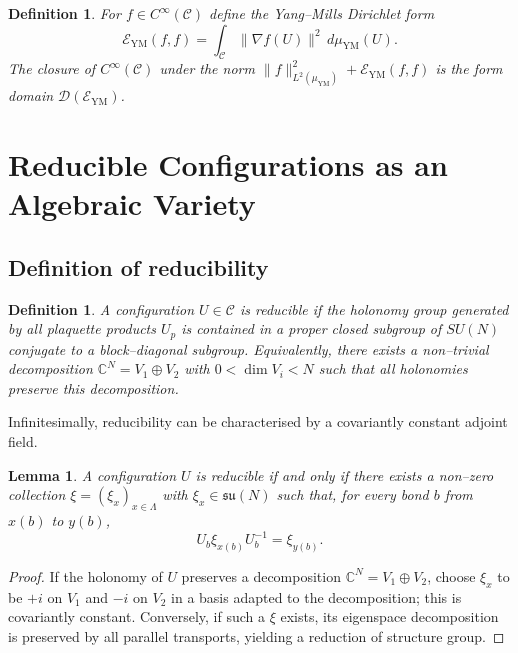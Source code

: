 \documentclass[11pt]{article}
\newtheorem{lemma}[theorem]{Lemma}
\newtheorem{definition}[theorem]{Definition}
\begin{document}
\begin{definition}
For $f\in C^\infty(\mathcal{C})$ define the Yang--Mills Dirichlet form
\begin{equation}
  \mathcal{E}_{\mathrm{YM}}(f,f)
  = \int_{\mathcal{C}} \|\nabla f(U)\|^2\,d\mu_{\mathrm{YM}}(U).
\end{equation}
The closure of $C^\infty(\mathcal{C})$ under the norm
$\|f\|_{L^2(\mu_{\mathrm{YM}})}^2 + \mathcal{E}_{\mathrm{YM}}(f,f)$ is
the form domain $\mathcal{D}(\mathcal{E}_{\mathrm{YM}})$.
\end{definition}

\section{Reducible Configurations as an Algebraic Variety}

\subsection{Definition of reducibility}

\begin{definition}
A configuration $U\in\mathcal{C}$ is \emph{reducible} if the holonomy
group generated by all plaquette products $U_p$ is contained in a
proper closed subgroup of $SU(N)$ conjugate to a block--diagonal
subgroup. Equivalently, there exists a non--trivial decomposition
$\mathbb{C}^N = V_1\oplus V_2$ with $0<\dim V_i<N$ such that all
holonomies preserve this decomposition.
\end{definition}

Infinitesimally, reducibility can be characterised by a covariantly
constant adjoint field.

\begin{lemma}
A configuration $U$ is reducible if and only if there exists a non--zero
collection $\xi = (\xi_x)_{x\in\Lambda}$ with $\xi_x\in\mathfrak{su}(N)$
such that, for every bond $b$ from $x(b)$ to $y(b)$,
\begin{equation}
  U_b\xi_{x(b)}U_b^{-1} = \xi_{y(b)}.
\end{equation}
\end{lemma}

\begin{proof}
If the holonomy of $U$ preserves a decomposition
$\mathbb{C}^N = V_1\oplus V_2$, choose $\xi_x$ to be $+i$ on $V_1$ and
$-i$ on $V_2$ in a basis adapted to the decomposition; this is
covariantly constant. Conversely, if such a $\xi$ exists, its eigenspace
decomposition is preserved by all parallel transports, yielding a
reduction of structure group.
\end{proof}
\end{document}
